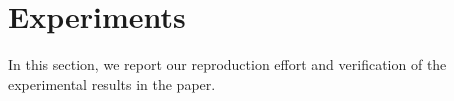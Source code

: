 \section{Experiments}
In this section, we report our reproduction effort and verification of the experimental results in the paper.